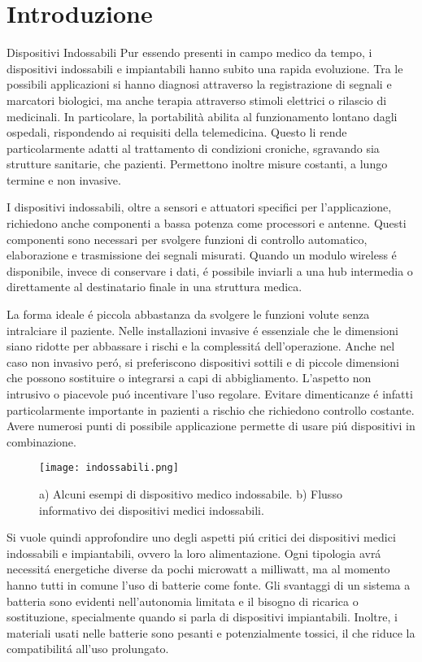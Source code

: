 \chapter{Introduzione}

\begin{section}{Dispositivi Indossabili}
    Pur essendo presenti in campo medico da tempo, i dispositivi indossabili e impiantabili hanno subito una rapida evoluzione. Tra le possibili applicazioni si hanno diagnosi attraverso la registrazione di segnali e marcatori biologici, ma anche terapia attraverso stimoli elettrici o rilascio di medicinali. In particolare, la portabilit\`a abilita al funzionamento lontano dagli ospedali, rispondendo ai requisiti della telemedicina. Questo li rende particolarmente adatti al trattamento di condizioni croniche, sgravando sia strutture sanitarie, che pazienti. Permettono inoltre misure costanti, a lungo termine e non invasive. 

    I dispositivi indossabili, oltre a sensori e attuatori specifici per l'applicazione, richiedono anche componenti a bassa potenza come processori e antenne. Questi componenti sono necessari per svolgere funzioni di controllo automatico, elaborazione e trasmissione dei segnali misurati. Quando un modulo wireless \'e disponibile, invece di conservare i dati, \'e possibile inviarli a una hub intermedia o direttamente al destinatario finale in una struttura medica.

    La forma ideale \'e piccola abbastanza da svolgere le funzioni volute senza intralciare il paziente. Nelle installazioni invasive \'e essenziale che le dimensioni siano ridotte per abbassare i rischi e la complessit\'a dell'operazione. Anche nel caso non invasivo per\'o, si preferiscono dispositivi sottili e di piccole dimensioni che possono sostituire o integrarsi a capi di abbigliamento. L'aspetto non intrusivo o piacevole pu\'o incentivare l'uso regolare. Evitare dimenticanze \'e infatti particolarmente importante in pazienti a rischio che richiedono controllo costante. Avere numerosi punti di possibile applicazione permette di usare pi\'u dispositivi in combinazione.

    \begin{figure}[H]
        \texttt{[image: indossabili.png]}
        \centering
        \caption{a) Alcuni esempi di dispositivo medico indossabile. b) Flusso informativo dei dispositivi medici indossabili.}
        \label{fig:indossabili}
    \end{figure}
    
    Si vuole quindi approfondire uno degli aspetti pi\'u critici dei dispositivi medici indossabili e impiantabili, ovvero la loro alimentazione. Ogni tipologia avr\'a necessit\'a energetiche diverse da pochi microwatt a milliwatt, ma al momento hanno tutti in comune l'uso di batterie come fonte. Gli svantaggi di un sistema a batteria sono evidenti nell'autonomia limitata e il bisogno di ricarica o sostituzione, specialmente quando si parla di dispositivi impiantabili. Inoltre, i materiali usati nelle batterie sono pesanti e potenzialmente tossici, il che riduce la compatibilit\'a all'uso prolungato.
\end{section}

